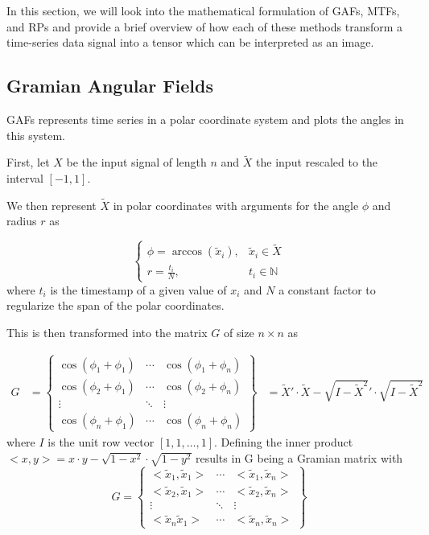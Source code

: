 In this section, we will look into the mathematical formulation of GAFs, MTFs, and RPs and provide a brief overview of how each of these methods transform a time-series data signal into a tensor which can be interpreted as an image.

\subsection{Gramian Angular Fields}

GAFs \cite{wang2015imaging} represents time series in a polar coordinate system and plots the angles in this system.

First, let $X$ be the input signal of length $n$ and $\tilde{X}$ the input rescaled to the interval $[-1, 1]$.

We then represent $\tilde{X}$ in polar coordinates with arguments for the angle $\phi$ and radius $r$ as

\begin{equation}
	\begin{cases}
		\phi = \arccos(\tilde{x}_i), & \tilde{x}_i \in \tilde{X} \\
		r = \frac{t_i}{N}, & t_{i} \in \mathbb{N}
	\end{cases}
\end{equation}
where $t_{i}$ is the timestamp of a given value of $x_i$ and $N$ a constant factor to regularize the span of the polar coordinates.

This is then transformed into the matrix $G$ of size $n \times n$ as

\begin{align}
	G &= \begin{Bmatrix}
		\cos(\phi_1 + \phi_1) & \cdots & \cos(\phi_1 + \phi_n) \\
		\cos(\phi_2 + \phi_1) & \cdots & \cos(\phi_2 + \phi_n) \\
		\vdots                & \ddots & \vdots \\
		\cos(\phi_n + \phi_1) & \cdots & \cos(\phi_n + \phi_n)
	\end{Bmatrix}
	&= \tilde{X}' \cdot \tilde{X} - \sqrt{I - \tilde{X}^2}' \cdot \sqrt{I - \tilde{X}^2}
\end{align}
where $I$ is the unit row vector $[1, 1, \ldots, 1]$.
Defining the inner product $< x,y> = x \cdot y - \sqrt{1 - x^2} \cdot \sqrt{1-y^2}$ results in G being a Gramian matrix with
\begin{equation}
	G = \begin{Bmatrix}
		< \tilde{x}_1, \tilde{x}_1 > & \cdots & < \tilde{x}_1, \tilde{x}_n >\\
		< \tilde{x}_2, \tilde{x}_1 > & \cdots & < \tilde{x}_2, \tilde{x}_n > \\
		\vdots                       & \ddots & \vdots \\
		< \tilde{x}_n \tilde{x}_1 > & \cdots & < \tilde{x}_n, \tilde{x}_n >
	\end{Bmatrix}
\end{equation}

